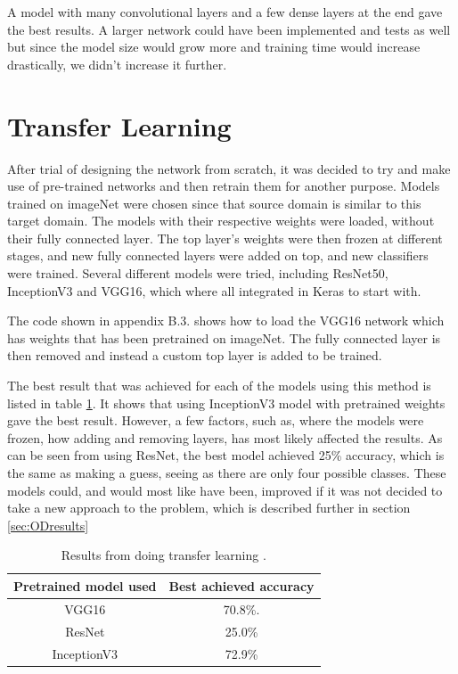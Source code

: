 A model with many convolutional layers and a few dense layers at the end gave the best
results. A larger network could have been implemented and tests as well but
since the model size would grow more and training time would increase drastically,
we didn't increase it further.

\section{Transfer Learning}
\label{sec:NNtransfer}
After trial of designing the network from scratch, it was decided to try and make use of 
pre-trained networks and then retrain them for another purpose. Models trained on 
imageNet \cite{imageNet} were chosen since that source domain is similar to this target 
domain. The models with their respective weights were loaded, without their fully 
connected layer. The top layer's weights were then frozen at different stages, and new 
fully connected layers were added on top, and new classifiers were trained. 
Several different models were tried, including ResNet50, InceptionV3 and VGG16, 
which where all integrated in Keras to start with.

The code shown in appendix B.3. shows how to load the VGG16 network which has weights that has been pretrained on imageNet. The fully connected layer is then removed and instead a custom top layer is added to be trained. 


The best result  that was achieved for each of the models using this method is listed in
 table \ref{table:transferLearning}. It shows that using InceptionV3 model with pretrained
 weights gave the best result. However, a few factors, such as, where the models were
 frozen, how adding and removing layers, has most likely affected the results. As can be
 seen from using ResNet, the best model achieved 25\% accuracy, which is the same as making a guess, seeing as there are only four possible classes. These models could, and would most like have been, improved if it was not decided to take a new approach to the problem, which is described further in section \ref{sec:ODresults}

\begin{table}[h]
\centering
\begin{tabular}{ |c|c| } 
 \hline
 Pretrained model used &  Best achieved accuracy  \\ 
 \hline
 VGG16 & 70.8\%. \\ 
 \hline
 ResNet & 25.0\% \\ 
  \hline
 InceptionV3 & 72.9\% \\ 
 \hline
\end{tabular}
\caption{Results from doing transfer learning .}
\label{table:transferLearning}
\end{table}


\newpage